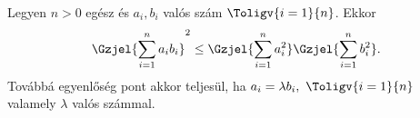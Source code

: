 
Legyen $n>0$ egész és $a_{i},b_{i}$ valós szám $\Toligv{i=1}{n}$. Ekkor
$$
\Gzjel{ \sum_{i=1}^{n} a_{i}b_{i} }^2 \le 
\Gzjel{ \sum_{i=1}^{n} a_{i}^2 } \Gzjel{ \sum_{i=1}^n b_{i}^{2} }.
$$
Továbbá egyenlőség pont akkor teljesül, ha $a_{i}=\lambda b_{i},\ \Toligv{i=1}{n}$ valamely 
$\lambda$ valós számmal.
